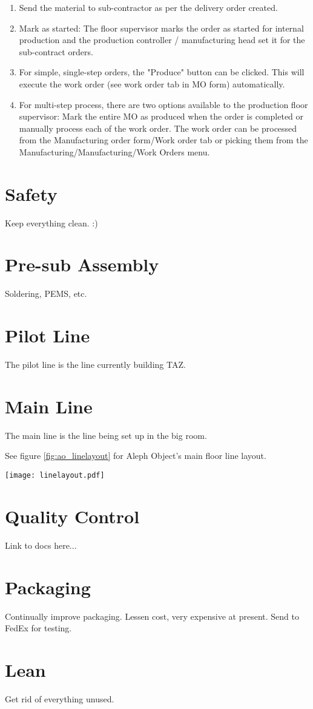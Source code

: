 \begin{enumerate}
\item Send the material to sub-contractor as per the delivery order created.
\item Mark as started: The floor supervisor marks the order as started for internal production and the production controller / manufacturing head set it for the sub-contract orders.
\item For simple, single-step orders, the "Produce" button can be clicked. This will execute the work order (see work order tab in MO form) automatically.
\item For multi-step process, there are two options available to the production floor supervisor: Mark the entire MO as produced when the order is completed or manually process each of the work order. The work order can be processed from the Manufacturing order form/Work order tab or picking them from the Manufacturing/Manufacturing/Work Orders menu.
\end{enumerate}

\section{Safety}
Keep everything clean. :)

\section{Pre-sub Assembly}
Soldering, PEMS, etc.

\section{Pilot Line}
The pilot line is the line currently building TAZ.

\section{Main Line}
The main line is the line being set up in the big room.

See figure \ref{fig:ao_linelayout} for Aleph Object's main floor line layout.

\begin{sidewaysfigure}[p]
\begin{center}
\texttt{[image: linelayout.pdf]}
\end{center}
\caption{Main Line Layout}
 \label{fig:ao_linelayout}
\end{sidewaysfigure}


\section{Quality Control}
Link to docs here...

\section{Packaging}
Continually improve packaging. Lessen cost, very expensive at present.
Send to FedEx for testing.

\section{Lean}
Get rid of everything unused.

